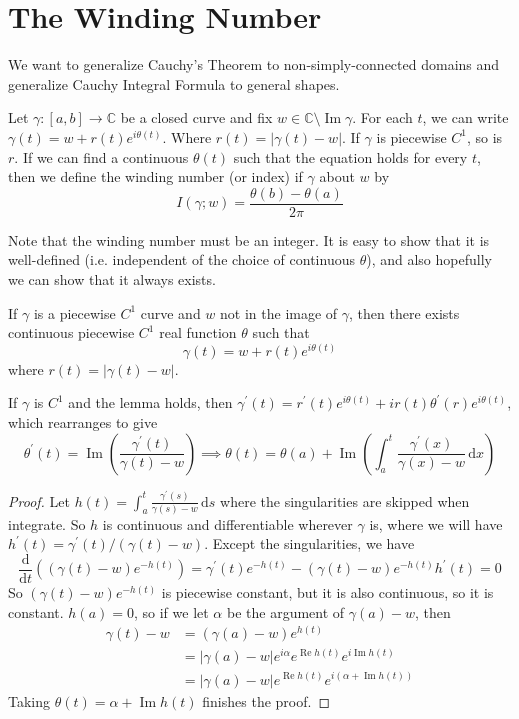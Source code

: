 \section{The Winding Number}
We want to generalize Cauchy's Theorem to non-simply-connected domains and generalize Cauchy Integral Formula to general shapes.
\begin{definition}
    Let $\gamma:[a,b]\to\mathbb C$ be a closed curve and fix $w\in\mathbb C\setminus\operatorname{Im}\gamma$.
    For each $t$, we can write $\gamma(t)=w+r(t)e^{i\theta(t)}$.
    Where $r(t)=|\gamma(t)-w|$.
    If $\gamma$ is piecewise $C^1$, so is $r$.
    If we can find a continuous $\theta(t)$ such that the equation holds for every $t$, then we define the winding number (or index) if $\gamma$ about $w$ by
    $$I(\gamma;w)=\frac{\theta(b)-\theta(a)}{2\pi}$$
\end{definition}
Note that the winding number must be an integer.
It is easy to show that it is well-defined (i.e. independent of the choice of continuous $\theta$), and also hopefully we can show that it always exists.
\begin{lemma}
    If $\gamma$ is a piecewise $C^1$ curve and $w$ not in the image of $\gamma$, then there exists continuous piecewise $C^1$ real function $\theta$ such that
    $$\gamma(t)=w+r(t)e^{i\theta(t)}$$
    where $r(t)=|\gamma(t)-w|$.
\end{lemma}
If $\gamma$ is $C^1$ and the lemma holds, then $\gamma^\prime(t)=r^\prime(t)e^{i\theta(t)}+ir(t)\theta^\prime(r)e^{i\theta(t)}$, which rearranges to give
$$\theta^\prime(t)=\operatorname{Im}\left( \frac{\gamma^\prime(t)}{\gamma(t)-w} \right)\implies\theta(t)=\theta(a)+\operatorname{Im}\left( \int_a^t \frac{\gamma^\prime(x)}{\gamma(x)-w}\,\mathrm dx\right)$$
\begin{proof}
    Let $h(t)=\int_a^t\frac{\gamma^\prime(s)}{\gamma(s)-w}\,\mathrm ds$ where the singularities are skipped when integrate.
    So $h$ is continuous and differentiable wherever $\gamma$ is, where we will have $h^\prime(t)=\gamma^\prime(t)/(\gamma(t)-w)$.
    Except the singularities, we have
    $$\frac{\mathrm d}{\mathrm dt}\left( (\gamma(t)-w)e^{-h(t)} \right)=\gamma^\prime(t)e^{-h(t)}-(\gamma(t)-w)e^{-h(t)}h^\prime(t)=0$$
    So $(\gamma(t)-w)e^{-h(t)}$ is piecewise constant, but it is also continuous, so it is constant.
    $h(a)=0$, so if we let $\alpha$ be the argument of $\gamma(a)-w$, then
    \begin{align*}
        \gamma(t)-w&=(\gamma(a)-w)e^{h(t)}\\
        &=|\gamma(a)-w|e^{i\alpha}e^{\operatorname{Re}h(t)}e^{i\operatorname{Im}h(t)}\\
        &=|\gamma(a)-w|e^{\operatorname{Re}h(t)}e^{i(\alpha+\operatorname{Im}h(t))}
    \end{align*}
    Taking $\theta(t)=\alpha+\operatorname{Im}h(t)$ finishes the proof.
\end{proof}
